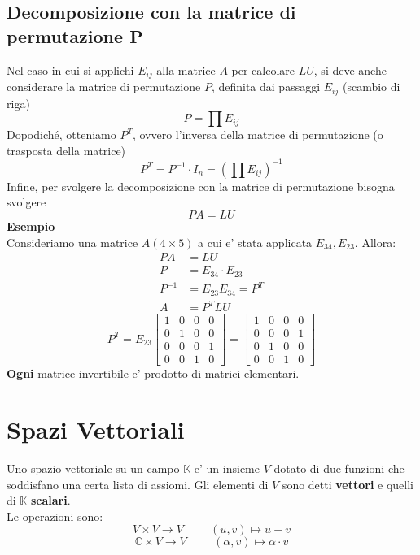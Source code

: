 \documentclass[a4paper, 10pt]{article}
\begin{document}
	\subsection{Decomposizione con la matrice di permutazione P}
	Nel caso in cui si applichi $E_{ij}$ alla matrice $A$ per calcolare $LU$, si deve anche considerare 
	la matrice di permutazione $P$, definita dai passaggi $E_{ij}$ (scambio di riga)
	\[ P = \prod E_{ij}\]
	Dopodiché, otteniamo $P^{T}$, ovvero l'inversa della matrice di permutazione (o trasposta della matrice)
	\[ P^{T} = P^{-1} \cdot I_{n} = (\prod E_{ij})^{-1} \]
	Infine, per svolgere la decomposizione con la matrice di permutazione bisogna svolgere
	\[ PA = LU \]
	\textbf{Esempio}\\
	Consideriamo una matrice $A (4 \times 5)$ a cui e' stata applicata $E_{34}, E_{23}$. Allora: 
	\begin{equation*}
		\begin{split}	
		PA &= LU \\	
		P &= E_{34} \cdot E_{23}  \\
		P^{-1} &= E_{23} E_{34} = P^{T} \\
		A &= P^{T}LU
		\end{split}
	\end{equation*}
	\[
		P^{T} = E_{23}
		\begin{bmatrix}
		1 & 0 & 0 & 0 \\
		0 & 1 & 0 & 0 \\
		0 & 0 & 0 & 1 \\
		0 & 0 & 1 & 0
		\end{bmatrix}
		=
		\begin{bmatrix}
		1 & 0 & 0 & 0 \\
		0 & 0 & 0 & 1 \\
		0 & 1 & 0 & 0 \\
		0 & 0 & 1 & 0
		\end{bmatrix}
	\]
	\textbf{Ogni} matrice invertibile e' prodotto di matrici elementari.
	\newpage

	\section{Spazi Vettoriali}
	Uno spazio vettoriale su un campo $\mathbb{K}$ e' un insieme $V$ dotato di due funzioni che soddisfano una 
	certa lista di assiomi. Gli elementi di $V$ sono detti \textbf{vettori} e quelli di $\mathbb{K}$ \textbf{scalari}. \\
	Le operazioni sono:
	\[ V \times V \longrightarrow V \hspace{1cm} (u,v) \mapsto u + v \]
	\[ \mathbb{C} \times V \longrightarrow V \hspace{1cm} (\alpha ,v) \mapsto \alpha \cdot v \]
	
\end{document}
